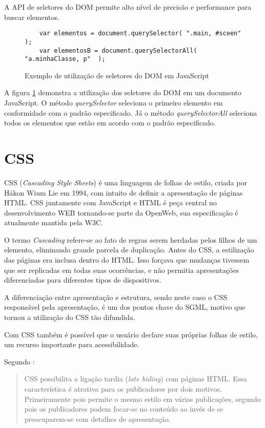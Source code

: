 A API de seletores do DOM permite alto nível de precisão e performance para buscar elementos.

\begin{figure}
\centering
\begin{verbatim}
    var elementos = document.querySelector( ".main, #sceen"  );
    var elementosB = document.querySelectorAll( "a.minhaClasse, p"  );
\end{verbatim}
\caption{Exemplo de utilização de seletores do DOM em JavaScript}
\label{fig:selectorsSample}
\end{figure}

A figura \ref{fig:selectorsSample} demonstra a utilização dos seletores do DOM em um documento
JavaScript. O método \textit{querySelector} seleciona o primeiro elemento em conformidade
com o padrão especificado. Já o método \textit{querySelectorAll} seleciona todos os elementos
que estão em acordo com o padrão especificado.


\section{CSS}

CSS (\textit{Cascading Style Sheets}) é uma linguagem de folhas de
estilo, criada por Håkon Wium Lie em 1994, com intuito de definir a
apresentação de páginas HTML. CSS juntamente com JavaScript e HTML
é peça central no desenvolvimento WEB tornando-se parte da OpenWeb,
sua especificação é atualmente mantida pela W3C.

O termo \textit{Cascading} refere-se ao fato de regras serem herdadas
pelos filhos de um elemento, eliminando grande parcela de duplicação.
Antes do CSS, a estilização das páginas era inclusa dentro do HTML.
Isso forçava que mudanças tivessem que ser replicadas em todas suas
ocorrências, e não permitia apresentações diferenciadas para
diferentes tipos de dispositivos.

A diferenciação entre apresentação e estrutura, sendo neste caso o
CSS responsável pela apresentação, é um dos pontos chave do SGML,
motivo que tornou a utilização do CSS tão difundida.

Com CSS também é possível que o usuário declare suas próprias
folhas de estilo, um recurso importante para acessibilidade.

Segundo \cite[pp. 23--24]{CascadingStyleSheets}:

\begin{quote}
CSS possibilita a ligação tardia (\textit{late biding}) com
páginas HTML. Essa característica é atrativa para os publicadores
por dois motivos. Primeiramente pois permite o mesmo estilo em várias
publicações, segundo pois os publicadores podem focar-se no conteúdo
ao invés de se preocuparem-se com detalhes de apresentação.
\end{quote}

